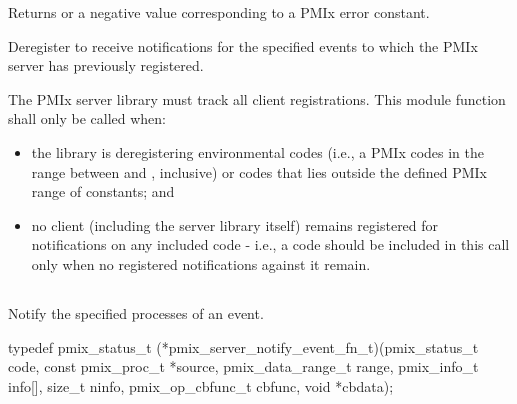 \begin{arglist}
\end{arglist}

Returns  or a negative value corresponding to a PMIx error constant.

\descr

Deregister to receive notifications for the specified events to which the \ac{PMIx} server has previously registered.

\adviceimplstart
The \ac{PMIx} server library must track all client registrations. This module function shall only be called when:

\begin{itemize}
    \item the library is deregistering environmental codes (i.e., a \ac{PMIx} codes in the range between  and , inclusive) or codes that lies outside the defined \ac{PMIx} range of constants; and
    \item no client (including the server library itself) remains registered for notifications on any included code - i.e., a code should be included in this call only when no registered notifications against it remain.
\end{itemize}

\adviceimplend


\subsection{}

\summary

Notify the specified processes of an event.

\format

\cspecificstart
\begin{codepar}
typedef pmix_status_t (*pmix_server_notify_event_fn_t)(pmix_status_t code,
                             const pmix_proc_t *source,
                             pmix_data_range_t range,
                             pmix_info_t info[],
                             size_t ninfo,
                             pmix_op_cbfunc_t cbfunc,
                             void *cbdata);
\end{codepar}
\cspecificend

